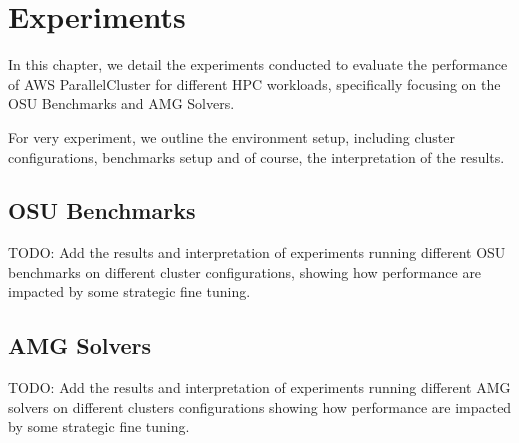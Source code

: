 

\chapter{Experiments}

In this chapter, we detail the experiments conducted to evaluate the performance of AWS ParallelCluster for different HPC workloads, specifically focusing on the OSU Benchmarks and AMG Solvers.

For very experiment, we outline the environment setup, including cluster configurations, benchmarks setup and of course, the interpretation of the results.

\section{OSU Benchmarks}

TODO: Add the results and interpretation of experiments running different OSU benchmarks on different cluster configurations, showing how performance are impacted by some strategic fine tuning.

\section{AMG Solvers}

TODO: Add the results and interpretation of experiments running different AMG solvers on different clusters configurations showing how performance are impacted by some strategic fine tuning.
